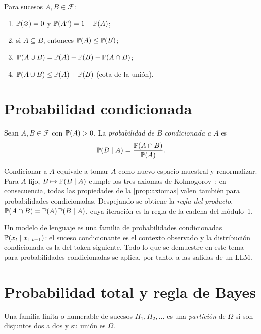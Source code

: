 \begin{proposicion}\label{prop:axiomas}
Para sucesos $A,B\in\mathcal{F}$:
\begin{enumerate}
  \item $\mathbb{P}(\varnothing)=0$ y $\mathbb{P}(A^{c})=1-\mathbb{P}(A)$;
  \item si $A\subseteq B$, entonces $\mathbb{P}(A)\le\mathbb{P}(B)$;
  \item $\mathbb{P}(A\cup B)=\mathbb{P}(A)+\mathbb{P}(B)-\mathbb{P}(A\cap B)$;
  \item $\mathbb{P}(A\cup B)\le\mathbb{P}(A)+\mathbb{P}(B)$ (cota de la unión).
\end{enumerate}
\end{proposicion}

\section{Probabilidad condicionada}

\begin{definicion}
Sean $A,B\in\mathcal{F}$ con $\mathbb{P}(A)>0$. La \emph{probabilidad de $B$ condicionada a $A$} es
\[
\mathbb{P}(B\mid A)=\frac{\mathbb{P}(A\cap B)}{\mathbb{P}(A)}.
\]
\end{definicion}

Condicionar a $A$ equivale a tomar $A$ como nuevo espacio muestral y renormalizar. Para $A$ fijo, $B\mapsto\mathbb{P}(B\mid A)$ cumple los tres axiomas de Kolmogorov~\cite[§1.3]{bt}; en consecuencia, todas las propiedades de la \cref{prop:axiomas} valen también para probabilidades condicionadas. Despejando se obtiene la \emph{regla del producto}, $\mathbb{P}(A\cap B)=\mathbb{P}(A)\,\mathbb{P}(B\mid A)$, cuya iteración es la regla de la cadena del módulo~1.

\begin{observacion}
Un modelo de lenguaje es una familia de probabilidades condicionadas $\mathbb{P}(x_t\mid x_{1:t-1})$: el suceso condicionante es el contexto observado y la distribución condicionada es la del token siguiente. Todo lo que se demuestre en este tema para probabilidades condicionadas se aplica, por tanto, a las salidas de un LLM.
\end{observacion}

\section{Probabilidad total y regla de Bayes}

\begin{definicion}[Partición]
Una familia finita o numerable de sucesos $H_1,H_2,\dots$ es una \emph{partición} de $\Omega$ si son disjuntos dos a dos y su unión es $\Omega$.
\end{definicion}

